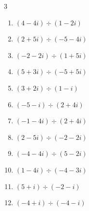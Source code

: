 \begin{multicols}{3}
\begin{enumerate}
  \item $\displaystyle (4-4i)\div(1-2i)$


  \item $\displaystyle (2+5i)\div(-5-4i)$


\columnbreak %

  \item $\displaystyle (-2-2i)\div(1+5i)$


  \item $\displaystyle (5+3i)\div(-5+5i)$


  \item $\displaystyle (3+2i)\div(1-i)$


  \item $\displaystyle (-5-i)\div(2+4i)$


  \item $\displaystyle (-1-4i)\div(2+4i)$


  \item $\displaystyle (2-5i)\div(-2-2i)$


  \item $\displaystyle (-4-4i)\div(5-2i)$


  \item $\displaystyle (1-4i)\div(-4-3i)$


  \item $\displaystyle (5+i)\div(-2-i)$


  \item $\displaystyle (-4+i)\div(-4-i)$


\end{enumerate}
\end{multicols}
